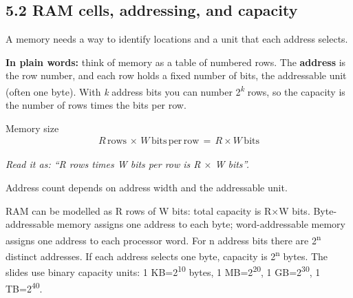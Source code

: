\documentclass[11pt]{article}
\begin{document}
\begin{keepsection}
\section{5.2 RAM cells, addressing, and capacity}

A memory needs a way to identify locations and a unit that each address selects.

\begin{plainbox}\textbf{In plain words:} think of memory as a table of numbered rows. The \textbf{address} is the row number, and each row holds a fixed number of bits, the addressable unit (often one byte). With \textit{k} address bits you can number 2\textsuperscript{\textit{k}} rows, so the capacity is the number of rows times the bits per row.\end{plainbox}

\begin{equationcard}{Memory size}
\[ \begin{gathered} {R}\, \text{rows}\, \times \, {W}\, \text{bits}\, \text{per}\, \text{row}\, =\, {R}\times {W}\, \text{bits} \end{gathered} \]
{\small \emph{Read it as: “R rows times W bits per row is R \ensuremath{\times} W bits”.}\par Address count depends on address width and the addressable unit.}
\end{equationcard}

\begin{center}
\begin{minipage}[t]{0.950\linewidth}\centering
{}\par{}\end{minipage}
\end{center}

RAM can be modelled as R rows of W bits: total capacity is R\ensuremath{\times}W bits. Byte-addressable memory assigns one address to each byte; word-addressable memory assigns one address to each processor word. For n address bits there are 2\textsuperscript{n} distinct addresses. If each address selects one byte, capacity is 2\textsuperscript{n} bytes. The slides use binary capacity units: 1 KB=2\textsuperscript{10} bytes, 1 MB=2\textsuperscript{20}, 1 GB=2\textsuperscript{30}, 1 TB=2\textsuperscript{40}.


\end{keepsection}
\end{document}
